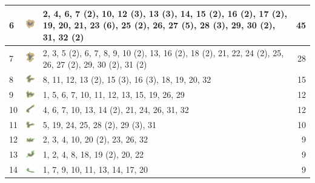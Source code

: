 \documentclass[final]{report}
\begin{document}
\begin{center}
\begin{longtable}{|p{0.5cm}|p{1.2cm}|p{11.89cm}|r|}
\hline
6 & \includegraphics[align=t,width=0.8cm]{0006} & 2, 4, 6, 7 (2), 10, 12 (3), 13 (3), 14, 15 (2), 16 (2), 17 (2), 19, 20, 21, 23 (6), 25 (2), 26, 27 (5), 28 (3), 29, 30 (2), 31, 32 (2) & 45 \\
\hline
7 & \includegraphics[align=t,width=0.8cm]{0007} & 2, 3, 5 (2), 6, 7, 8, 9, 10 (2), 13, 16 (2), 18 (2), 21, 22, 24 (2), 25, 26, 27 (2), 29, 30 (2), 31 (2) & 28 \\
\hline
8 & \includegraphics[align=t,width=0.8cm]{0008} & 8, 11, 12, 13 (2), 15 (3), 16 (3), 18, 19, 20, 32 & 15 \\
\hline
9 & \includegraphics[align=t,width=0.8cm]{0009} & 1, 5, 6, 7, 10, 11, 12, 13, 15, 19, 26, 29 & 12 \\
\hline
10 & \includegraphics[align=t,width=0.8cm]{0010} & 4, 6, 7, 10, 13, 14 (2), 21, 24, 26, 31, 32 & 12 \\
\hline
11 & \includegraphics[align=t,width=0.8cm]{0011} & 5, 19, 24, 25, 28 (2), 29 (3), 31 & 10 \\
\hline
12 & \includegraphics[align=t,width=0.8cm]{0012} & 2, 3, 4, 10, 20 (2), 23, 26, 32 & 9 \\
\hline
13 & \includegraphics[align=t,width=0.8cm]{0013} & 1, 2, 4, 8, 18, 19 (2), 20, 22 & 9 \\
\hline
14 & \includegraphics[align=t,width=0.8cm]{0014} & 1, 7, 9, 10, 11, 13, 14, 17, 20 & 9 \\

\end{longtable}
\end{center}
\end{document}

